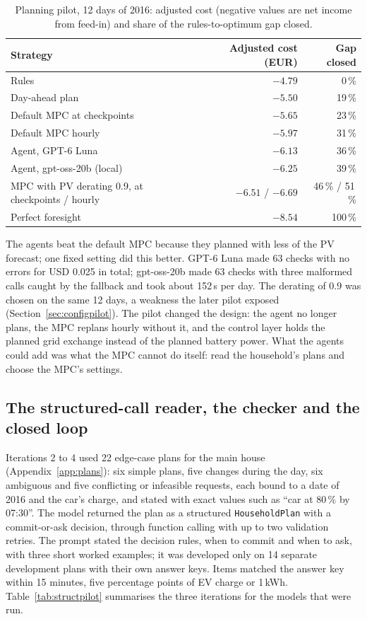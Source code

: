 \begin{table}[htbp]
\caption{Planning pilot, 12 days of 2016: adjusted cost (negative values
are net income from feed-in) and share of the rules-to-optimum gap
closed.}
\label{tab:gatewaypilot}
\small
\begin{tabularx}{\textwidth}{@{}Xrr@{}}
\toprule
Strategy & Adjusted cost (EUR) & Gap closed \\
\midrule
Rules & $-4.79$ & 0\,\% \\
Day-ahead plan & $-5.50$ & 19\,\% \\
Default MPC at checkpoints & $-5.65$ & 23\,\% \\
Default MPC hourly & $-5.97$ & 31\,\% \\
Agent, GPT-6 Luna & $-6.13$ & 36\,\% \\
Agent, gpt-oss-20b (local) & $-6.25$ & 39\,\% \\
MPC with PV derating 0.9, at checkpoints / hourly & $-6.51$ / $-6.69$ & 46\,\% / 51\,\% \\
Perfect foresight & $-8.54$ & 100\,\% \\
\bottomrule
\end{tabularx}
\end{table}

The agents beat the default MPC because they planned with less of the
PV forecast; one fixed setting did this better. GPT-6 Luna made 63
checks with no errors for USD 0.025 in total; gpt-oss-20b made 63
checks with three malformed calls caught by the fallback and took about
152\,s per day. The derating of 0.9 was chosen on the same 12 days, a
weakness the later pilot exposed (Section~\ref{sec:configpilot}). The
pilot changed the design: the agent no longer plans, the MPC replans
hourly without it, and the control layer holds the planned grid exchange
instead of the planned battery power. What the agents could add was
what the MPC cannot do itself: read the household's plans and choose
the MPC's settings.

\subsection{The structured-call reader, the checker and the closed loop}
\label{sec:planpilot}
\label{sec:looppilot}

Iterations 2 to 4 used 22 edge-case plans for the main house
(Appendix~\ref{app:plans}): six simple plans, five changes during the
day, six ambiguous and five conflicting or infeasible requests, each
bound to a date of 2016 and the car's charge, and stated with exact
values such as ``car at 80\,\% by 07:30''. The model returned the plan
as a structured \texttt{HouseholdPlan} with a commit-or-ask decision,
through function calling with up to two validation retries. The prompt
stated the decision rules, when to commit and when to ask, with three
short worked examples; it was developed only on 14 separate development
plans with their own answer keys. Items
matched the answer key within 15 minutes, five percentage points of EV
charge or 1\,kWh. Table~\ref{tab:structpilot} summarises the three
iterations for the models that were run.

